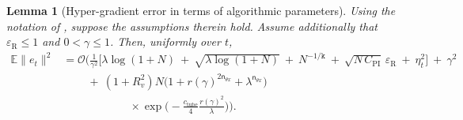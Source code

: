 \documentclass{article}
\theoremstyle{normaltheorem}
\newtheorem{lemma}[lemma]{Lemma}
\newcommand{\dimk}{\texttt{k}}
\begin{document}
\begin{lemma}[Hyper-gradient error in terms of algorithmic parameters]\label{lem:app-et2-bigO}
Using the notation of , suppose the assumptions therein hold.
Assume additionally that \(\varepsilon_{\mathrm R}\le1\) and \(0<\gamma\le1\).
Then, uniformly over \(t\),
\begin{equation}\label{eq:app-et2-bigO}
\begin{aligned}
\mathbb E\|e_t\|^2
&=
\mathcal{O}\!\Bigg(
\frac{1}{\gamma^2}
\Big[
\lambda\log(1+N)
\ +\ \sqrt{\lambda\log(1+N)}
\ +\ N^{-1/\dimk}
\ +\ \sqrt{N\,C_{\mathrm{PI}}}\,\varepsilon_{\mathrm R}
\ +\ \eta_t^2
\Big]
\ +\ \gamma^2\\
&\qquad
\ +\ (1+R_v^2)N
\big(1+r(\gamma)^{2\mathsf n_{\theta x}}+\lambda^{\mathsf n_{\theta x}}\big)\\
&\qquad\qquad\qquad
\times\exp\!\Big(-\tfrac{c_{\mathrm{tube}}}{4}\tfrac{r(\gamma)^2}{\lambda}\Big)
\Bigg).
\end{aligned}
\end{equation}
\end{lemma}
\end{document}
